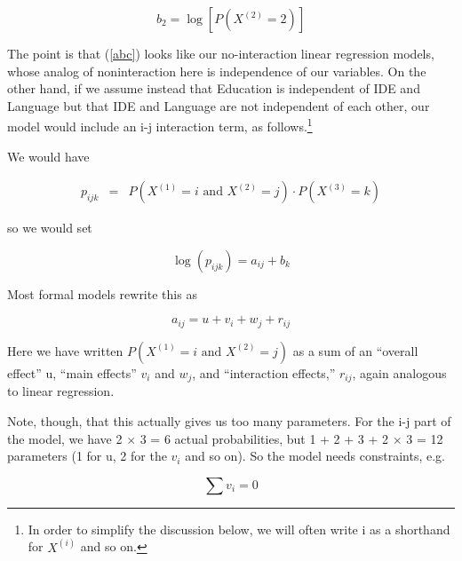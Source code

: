 \begin{equation}
b_2 = \log[P(X^{(2)} = 2)]
\end{equation}

% 
% 
% 

The point is that (\ref{abc}) looks like our no-interaction linear
regression models, whose analog of noninteraction here is independence
of our variables.  On the other hand, if we assume instead that
Education is independent of IDE and Language but that IDE and Language
are not independent of each other, our model would include an i-j
interaction term, as follows.\footnote{In order to simplify the
discussion below, we will often write i as a shorthand for $X^{(i)}$ and
so on.}

We would have

\begin{eqnarray}
p_{ijk} &=& 
        P \left ( X^{(1)} = i \textrm{ and } X^{(2)} = j \right ) \cdot 
        P \left ( X^{(3)} = k \right ) 
\end{eqnarray}

so we would set 

\begin{equation}
\log(p_{ijk}) =
a_{ij} + b_k \label{semiindep}
\end{equation}

Most formal models rewrite this as

\begin{equation}
\label{anova}
a_{ij} = u + v_i + w_j + r_{ij}
\end{equation}

Here we have written $P \left ( X^{(1)} = i \textrm{ and } X^{(2)} = j
\right )$ as a sum of an ``overall effect'' u, ``main effects'' $v_i$
and $w_j$, and ``interaction effects,'' $r_{ij}$, again analogous to
linear regression.  

Note, though, that this actually gives us too many parameters.  For the
i-j part of the model, we have 2 $\times$ 3 = 6 actual probabilities,
but 1 + 2 + 3 +  2 $\times$ 3 = 12 parameters (1 for u, 2 for the $v_i$
and so on).  So the model needs constraints, e.g.

\begin{equation}
\sum v_i = 0
\end{equation}

